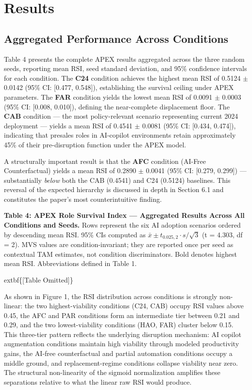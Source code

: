 \documentclass[10pt, conference]{IEEEtran}
\begin{document}
\section{Results}

\label{sec:results}

\subsection{Aggregated Performance Across Conditions}

\label{sec:aggregated_performance_across_conditions}

Table 4 presents the complete APEX results aggregated across the three random seeds, reporting mean RSI, seed standard deviation, and 95\% confidence intervals for each condition. The \textbf{C24} condition achieves the highest mean RSI of 0.5124 $\pm$ 0.0142 (95\% CI: [0.477, 0.548]), establishing the survival ceiling under APEX parameters. The \textbf{FAR} condition yields the lowest mean RSI of 0.0091 $\pm$ 0.0003 (95\% CI: [0.008, 0.010]), defining the near-complete displacement floor. The \textbf{CAB} condition --- the most policy-relevant scenario representing current 2024 deployment --- yields a mean RSI of 0.4541 $\pm$ 0.0081 (95\% CI: [0.434, 0.474]), indicating that presales roles in AI-copilot environments retain approximately 45\% of their pre-disruption function under the APEX model.

A structurally important result is that the \textbf{AFC} condition (AI-Free Counterfactual) yields a mean RSI of 0.2890 $\pm$ 0.0041 (95\% CI: [0.279, 0.299]) --- substantially \textit{below} both the CAB (0.4541) and C24 (0.5124) baselines. This reversal of the expected hierarchy is discussed in depth in Section 6.1 and constitutes the paper's most counterintuitive finding.

\textbf{Table 4: APEX Role Survival Index --- Aggregated Results Across All Conditions and Seeds.} Rows represent the six AI adoption scenarios ordered by descending mean RSI. 95\% CIs computed as $\bar{x} \pm t_{0.025,2} \cdot s/\sqrt{3}$ (t = 4.303, df = 2). MVS values are condition-invariant; they are reported once per seed as contextual TAM estimates, not condition discriminators. Bold denotes highest mean RSI. Abbreviations defined in Table 1.

	extbf\{[Table Omitted]\}

As shown in Figure 1, the RSI distribution across conditions is strongly non-linear: the two highest-viability conditions (C24, CAB) occupy RSI values above 0.45, the AFC and PAR conditions form an intermediate tier between 0.21 and 0.29, and the two lowest-viability conditions (HAO, FAR) cluster below 0.15. This three-tier pattern reflects the underlying disruption mechanism: AI copilot augmentation conditions maintain high viability through modeled productivity gains, the AI-free counterfactual and partial automation conditions occupy a middle ground, and replacement-regime conditions collapse viability near zero. The structural non-linearity of the sigmoid normalization amplifies these separations relative to what the linear raw RSI would produce.
\end{document}
